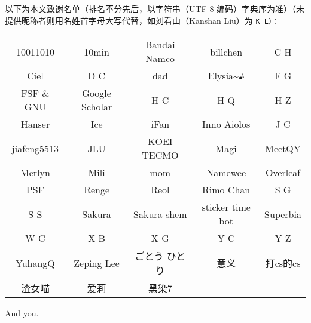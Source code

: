 {    \par 以下为本文致谢名单（排名不分先后，以字符串（UTF-8 编码）字典序为准）（未提供昵称者则用名姓首字母大写代替，如刘看山（Kanshan Liu）为 \tt{K L}）：

    \begin{center}
    \begin{tabular}{ccccc}
        10011010 & 10min & Bandai Namco & billchen & C H \\
        Ciel & D C & dad & Elysia\textasciitilde♪ & F G \\
        FSF \& GNU & Google Scholar & H C & H Q & H Z \\
        Hanser & Ice & iFan & Inno Aiolos & J C \\
        jiafeng5513 & JLU & KOEI TECMO & Magi & MeetQY \\
        Merlyn & Mili & mom & Namewee & Overleaf \\
        PSF & Renge & Reol & Rimo Chan & S G \\
        S S & Sakura & Sakura shem & sticker time bot & Superbia \\
        W C & X B & X G & Y C & Y Z \\
        YuhangQ & Zeping Lee & ごとう ひとり & 意义 & 打cs的cs \\
        渣女喵 & 爱莉 & 黑染7 & \\
    \end{tabular}
    \end{center}

    \par And you.
}
